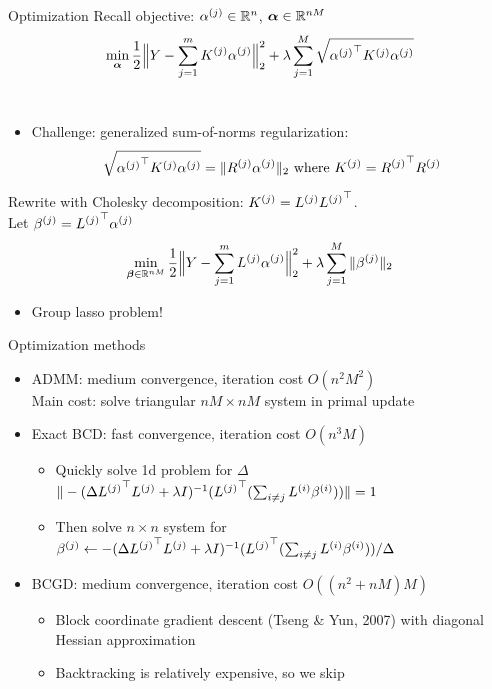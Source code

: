\begin{frame}{Optimization}
Recall objective:  ${\alpha^{(j)}} \in \mathbb{R}^n$, ${\bm{\alpha}} \in \mathbb{R}^{nM}$
\begin{equation*}
\min_{\bm{\alpha}} \frac{1}{2}\Big\|Y - \sum_{j=1}^m {K^{(j)}} {\alpha^{(j)}}\Big\|_2^2 + 
  \lambda \sum_{j=1}^M \sqrt{{{\alpha^{(j)}}}^\top {K^{(j)}} {\alpha^{(j)}}}
\end{equation*} \\
\begin{itemize}
\item  Challenge: generalized sum-of-norms regularization:
\begin{equation*}
\sqrt{{{\alpha^{(j)}}}^\top {K^{(j)}} {\alpha^{(j)}}} = \|{R^{(j)}} {\alpha^{(j)}} \|_2 
\text{ where } {K^{(j)}} = {R^{(j)}}^\top {R^{(j)}}
\end{equation*}
\end{itemize}
Rewrite with Cholesky decomposition: ${K^{(j)}} = {L^{(j)}} {L^{(j)}}^\top$. \\ 
Let ${\beta^{(j)}} = {L^{(j)}}^\top {\alpha^{(j)}}$
\begin{equation*}
\min_{{\bm{\beta}} \in \mathbb{R}^{nM}} 
\frac{1}{2}\Big\|Y - \sum_{j=1}^m {L^{(j)}} {\alpha^{(j)}}\Big\|_2^2 + 
\lambda \sum_{j=1}^M \|{\beta^{(j)}}\|_2
\end{equation*}
\vspace{-0.2in}
\begin{itemize}
\item Group lasso problem!
\end{itemize}
\end{frame}

\begin{frame}{Optimization methods}
\begin{itemize}
\item ADMM: medium convergence, iteration cost $O(n^2M^2)$ \\
Main cost: solve triangular $nM \times nM$ system in primal update
\item Exact BCD: fast convergence, iteration cost $O(n^3 M)$ \\
\begin{itemize}
\item Quickly solve 1d problem for $\Delta$
$\|-(\Delta {L^{(j)}}^\top{L^{(j)}} + \lambda I)^{-1}({L^{(j)}}^\top (\sum_{i\neq j}{L^{(i)}} {\beta^{(i)}}))\|=1$
\item Then solve $n \times n$ system for 
${\beta^{(j)}} \leftarrow -(\Delta {L^{(j)}}^\top{L^{(j)}}+\lambda I)^{-1}({L^{(j)}}^\top(\sum_{i\neq j}{L^{(i)}} {\beta^{(i)}}))/\Delta$
\end{itemize}
\item BCGD: medium convergence, iteration cost $O((n^2+nM)M)$
\begin{itemize}
\item Block coordinate gradient descent (Tseng \& Yun, 2007) 
with diagonal Hessian approximation
\item Backtracking is relatively expensive, so we skip
\end{itemize}
\end{itemize}
\end{frame}

